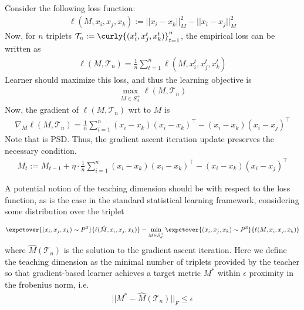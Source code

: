 Consider the following loss function:
\begin{align*}
    \ell(M, x_i,x_j,x_k) := ||x_i - x_k||^2_{M} - ||x_i - x_j||^2_{M}
\end{align*}
Now, for $n$ triplets $\mathcal{T}_n := \curly{(x_i^t,x_j^t,x_k^t)}_{t=1}^n$, the empirical loss can be written as 
\begin{align*}
    \ell(M, \mathcal{T}_n) = \frac{1}{n} \sum_{t=1}^n \ell(M,x_i^t,x_j^t,x_k^t)
\end{align*}
Learner should maximize this loss, and thus the learning objective is 
\begin{align}
    \max_{M \in S^+_d} \ell(M, \mathcal{T}_n)
\end{align}
Now, the gradient of $\ell(M,\mathcal{T}_n)$ wrt to $M$ is 
\begin{align}
    \nabla_M \ell(M, \mathcal{T}_n) = \frac{1}{n} \sum_{i=1}^n (x_i - x_k)(x_i - x_k)^{\top} - (x_i - x_k)(x_i - x_j)^{\top} \label{eq: grad}
\end{align}
Note that  is PSD. Thus, the gradient ascent iteration update preserves the necessary condition.
\begin{align*}
    M_t := M_{t-1} + \eta\cdot \frac{1}{n} \sum_{i=1}^n (x_i - x_k)(x_i - x_k)^{\top} - (x_i - x_k)(x_i - x_j)^{\top}
\end{align*}

A potential notion of the teaching dimension should be with respect to the loss function, as is the case in the standard statistical learning framework, considering some distribution over the triplet

\begin{align*}
    \expctover{(x_i,x_j,x_k) \sim P^3}{\ell(\hat{M}, x_i,x_j,x_k)} - \min_{M \in S^+_d}\expctover{(x_i,x_j,x_k) \sim P^3}{\ell(M, x_i,x_j,x_k)}\\
\end{align*}
where $\hat{M}(\mathcal{T}_n)$ is the solution to the gradient ascent iteration. Here we define the teaching dimension as the minimal number of triplets provided by the teacher so that gradient-based learner achieves a target metric $M^*$ within $\epsilon$ proximity in the frobenius norm, i.e.
\begin{align*}
    ||M^* - \hat{M}(\mathcal{T}_n)||_{F} \le \epsilon
\end{align*}


